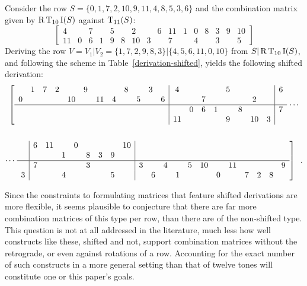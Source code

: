 \begin{example}
    \cite[216]{Starr1984}
    \label{ex:derivation-shifted}
    Consider the row $S = \{ 0, 1, 7, 2, 10, 9, 11, 4, 8, 5, 3, 6 \}$ and the combination matrix given by $\operatorname{R}\operatorname{T}_{10}\operatorname{I}(S)$ against $\operatorname{T}_{11}(S)$:
    \begin{equation}
        \left[
        \begin{array}{cccccccc|cccccccc}
            4 && 7 && 5 && 2 && 6 & 11 & 1 & 0 & 8 & 3 & 9 & 10 \\
            11 & 0 & 6 & 1 & 9 & 8 & 10 & 3 && 7 && 4 && 3 && 5
        \end{array}
        \right]
    \end{equation}
    Deriving the row $V = V_1 | V_2 = \{ 1, 7, 2, 9, 8, 3 \} | \{ 4, 5, 6, 11, 0, 10 \}$ from $S | \operatorname{R}\operatorname{T}_{10}\operatorname{I}(S)$, and following the scheme in Table~\ref{derivation-shifted}, yields the following shifted derivation:
    \begin{multline}
        \left[
        \begin{array}{cccccccccccc|cccccccc|c}
            & 1 & 7 & 2 && 9 &&& 8 && 3 && 4 &&&& 5 &&&& 6 \\
            0 &&&& 10 && 11 & 4 && 5 && 6 & && 7 &&&& 2 && \\
            \hline
            &&&&&&&&&&&& & 0 & 6 & 1 && 8 &&& 7 \\
            &&&&&&&&&&&& 11 &&&& 9 && 10 & 3 &
        \end{array}
        \right. \cdots \\\\
        \cdots \left. \begin{array}{c|cccccccc|cccccccccccc}
            & 6 & 11 && 0 &&&& 10 &&&&&&&&&&& \\
            & && 1 && 8 & 3 & 9 & &&&&&&&&&&& \\
            \hline
            & 7 &&&& 3 &&& & 3 && 4 && 5 & 10 && 11 &&&& 9 \\
            3 &&& 4 &&&& 5 & && 6 && 1 &&& 0 && 7 & 2 & 8
        \end{array} \right] \enspace.
    \end{multline}
\end{example}

Since the constraints to formulating matrices that feature shifted derivations are more flexible, it seems plausible to conjecture that there are far more combination matrices of this type per row, than there are of the non-shifted type. This question is not at all addressed in the literature, much less how well constructs like these, shifted and not, support combination matrices without the retrograde, or even against rotations of a row. Accounting for the exact number of such constructs in a more general setting than that of twelve tones will constitute one or this paper's goals.

